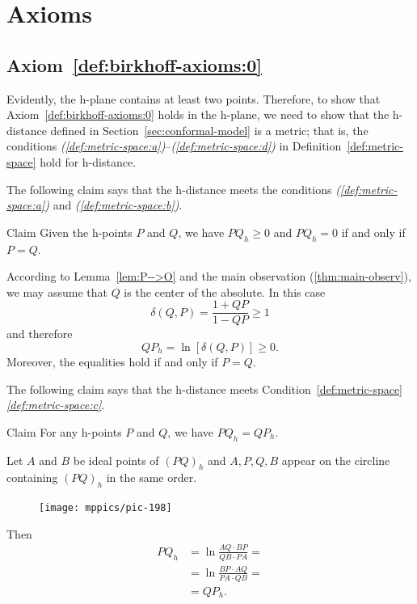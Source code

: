 \section[Axioms]{Axioms}
\subsection*{Axiom~\ref{def:birkhoff-axioms:0}}

Evidently, the h-plane contains at least two points.
Therefore, to show that Axiom~\ref{def:birkhoff-axioms:0} holds in the h-plane, we need to show that the h-distance defined in Section~\ref{sec:conformal-model} is a metric;
that is, the conditions \textit{(\ref{def:metric-space:a})}--\textit{(\ref{def:metric-space:d})} 
in Definition~\ref{def:metric-space} hold for h-distance.


The following claim says that the h-distance meets the conditions \textit{(\ref{def:metric-space:a})} 
and \textit{(\ref{def:metric-space:b})}.

\begin{thm}{Claim}
Given the h-points $P$ and $Q$, we have
$PQ_h\ge 0$
and $PQ_h=0$ if and only if $P=Q$.
\end{thm}


According to Lemma~\ref{lem:P-->O}
and the main observation (\ref{thm:main-observ}), 
we may assume that $Q$ is the center of the absolute.
In this case
$$
\delta(Q,P)=\frac{1+QP}{1-QP}\ge 1$$
and therefore
$$QP_h=\ln[\delta(Q,P)]\ge 0.$$
Moreover, the equalities hold if and only if $P=Q$.
\qeds

The following claim says that the h-distance meets Condition~\ref{def:metric-space}\textit{\ref{def:metric-space:c}}.

\begin{thm}{Claim}
For any h-points $P$ and $Q$, we have
$PQ_h=QP_h$.
\end{thm}

Let $A$ and $B$ be ideal points of $(PQ)_h$ and
$A,P,Q,B$ appear on the circline containing $(PQ)_h$ in the same order.

{

\begin{figure}
\vskip-5mm
\centering
\texttt{[image: mppics/pic-198]}
\end{figure}

Then
\begin{align*}
PQ_h
&=\ln\frac{AQ\cdot BP}{QB\cdot PA}
=
\\
&=\ln\frac{BP\cdot AQ}{PA\cdot QB}=
\\
&=QP_h.
\end{align*}
\qedsf

}

